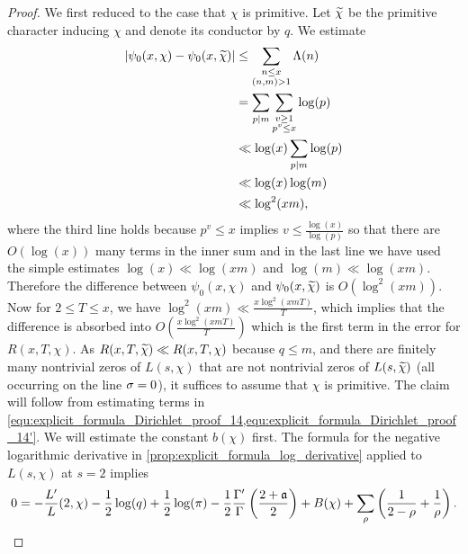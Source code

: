     \begin{proof}
      We first reduced to the case that $\chi$ is primitive. Let $\widetilde{\chi}$ be the primitive character inducing $\chi$ and denote its conductor by $q$. We estimate
      \begin{equation}\label{equ:difference_between_Dirichlet-Chebyshevs}
        \begin{aligned}
          |\psi_{0}(x,\chi)-\psi_{0}(x,\widetilde{\chi})| &\le \sum_{\substack{n \le x \\ (n,m) > 1}}\Lambda(n) \\
          &= \sum_{p \mid m}\sum_{\substack{v \ge 1 \\ p^{v} \le x}}\log(p) \\
          &\ll \log(x)\sum_{p \mid m}\log(p) \\
          &\ll \log(x)\log(m) \\
          &\ll \log^{2}(xm),
        \end{aligned}
      \end{equation}
      where the third line holds because $p^{v} \le x$ implies $v \le \frac{\log(x)}{\log(p)}$ so that there are $O(\log(x))$ many terms in the inner sum and in the last line we have used the simple estimates $\log(x) \ll \log(xm)$ and $\log(m) \ll \log(xm)$. Therefore the difference between $\psi_{0}(x,\chi)$ and $\psi_{0}(x,\widetilde{\chi})$ is $O(\log^{2}(xm))$. Now for $2 \le T \le x$, we have $\log^{2}(xm) \ll \frac{x\log^{2}(xmT)}{T}$, which implies that the difference is absorbed into $O\left(\frac{x\log^{2}(xmT)}{T}\right)$ which is the first term in the error for $R(x,T,\chi)$. As $R(x,T,\widetilde{\chi}) \ll R(x,T,\chi)$ because $q \le m$, and there are finitely many nontrivial zeros of $L(s,\chi)$ that are not nontrivial zeros of $L(s,\widetilde{\chi})$ (all occurring on the line $\sigma = 0$), it suffices to assume that $\chi$ is primitive. The claim will follow from estimating terms in \cref{equ:explicit_formula_Dirichlet_proof_14,equ:explicit_formula_Dirichlet_proof_14'}. We will estimate the constant $b(\chi)$ first. The formula for the negative logarithmic derivative in \cref{prop:explicit_formula_log_derivative} applied to $L(s,\chi)$ at $s = 2$ implies
      \begin{equation}\label{equ:explicit_formula_Dirichlet_corollary_1}
        0 = -\frac{L'}{L}(2,\chi)-\frac{1}{2}\log(q)+\frac{1}{2}\log(\pi)-\frac{1}{2}\frac{\Gamma'}{\Gamma}\left(\frac{2+\mathfrak{a}}{2}\right)+B(\chi)+\sum_{\rho}\left(\frac{1}{2-\rho}+\frac{1}{\rho}\right).
      \end{equation}

\end{proof}
